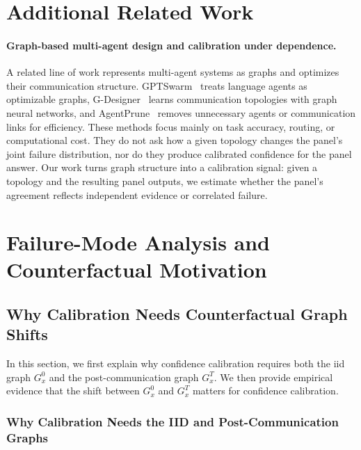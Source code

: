 \appendix

\section{Additional Related Work}
\label{app:related_work}

\label{con:related_work_for_graph}
\paragraph{Graph-based multi-agent design and calibration under dependence.}
A related line of work represents multi-agent systems as graphs and optimizes their communication structure. 
GPTSwarm~\citep{zhuge2024languageagentsoptimizablegraphs} treats language agents as optimizable graphs, G-Designer~\citep{zhang2025gdesignerarchitectingmultiagentcommunication} learns communication topologies with graph neural networks, and AgentPrune~\citep{zhang2024cutcrapeconomicalcommunication} removes unnecessary agents or communication links for efficiency. 
These methods focus mainly on task accuracy, routing, or computational cost. 
They do not ask how a given topology changes the panel's joint failure distribution, nor do they produce calibrated confidence for the panel answer. 
Our work turns graph structure into a calibration signal: given a topology and the resulting panel outputs, we estimate whether the panel's agreement reflects independent evidence or correlated failure.



\section{Failure-Mode Analysis and Counterfactual Motivation}
\label{app:failure_analysis}
\subsection{Why Calibration Needs Counterfactual Graph Shifts}
\label{con:analysis_progress}
In this section, we first explain why confidence calibration requires both the iid graph \(G_x^0\) and the post-communication graph \(G_x^T\). We then provide empirical evidence that the shift between \(G_x^0\) and \(G_x^T\) matters for confidence calibration.

\subsubsection{Why Calibration Needs the IID and Post-Communication Graphs}
\label{con:why_two_graphs}

